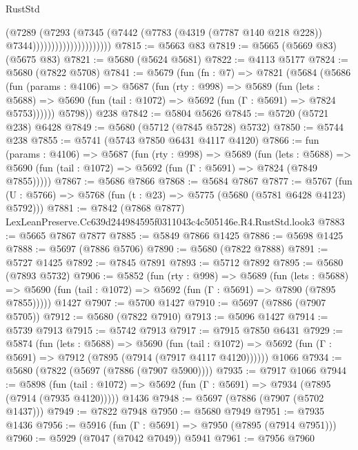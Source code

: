 \begin{lexlean}{RustStd}
\begin{coremodule}
                                    (@7289
                                      (@7293
                                        (@7345
                                          (@7442
                                            (@7783
                                              (@4319 (@7787 @140 @218 @228))
                                              @7344)))))))))))))))))))))
@7815 := @5663 @83
@7819 := @5665 (@5669 @83) (@5675 @83)
@7821 := @5680 (@5624 @5681)
@7822 := @4113 @5177
@7824 := @5680 (@7822 @5708)
@7841 := @5679
    (fun (fn : @7) =>
    @7821
      (@5684
        (@5686
          (fun (params : @4106) =>
          @5687
            (fun (rty : @998) =>
            @5689
              (fun (lets : @5688) =>
              @5690 (fun (tail : @1072) => @5692 (fun (Γ : @5691) => @7824 @5753))))))
        @5798))
    @238
@7842 := @5804 @5626
@7845 := @5720 (@5721 @238) @6428
@7849 := @5680 (@5712 (@7845 @5728) @5732)
@7850 := @5744 @238
@7855 := @5741 (@5743 @7850 @6431 @4117 @4120)
@7866 := fun (params : @4106) =>
  @5687
    (fun (rty : @998) =>
    @5689
      (fun (lets : @5688) =>
      @5690 (fun (tail : @1072) => @5692 (fun (Γ : @5691) => @7824 (@7849 @7855)))))
@7867 := @5686 @7866
@7868 := @5684 @7867
@7877 := @5767 (fun (U : @5766) => @5768 (fun (t : @23) => @5775 (@5680 (@5781 @6428 @4123) @5792)))
@7881 := @7842 (@7868 @7877) LexLeanPreserve.Cc639d244984595f0311043c4c505146e.R4.RustStd.look3
@7883 := @5665 @7867 @7877
@7885 := @5849 @7866 @1425
@7886 := @5698 @1425
@7888 := @5697 (@7886 @5706)
@7890 := @5680 (@7822 @7888)
@7891 := @5727 @1425
@7892 := @7845 @7891
@7893 := @5712 @7892
@7895 := @5680 (@7893 @5732)
@7906 := @5852
    (fun (rty : @998) =>
    @5689
      (fun (lets : @5688) =>
      @5690 (fun (tail : @1072) => @5692 (fun (Γ : @5691) => @7890 (@7895 @7855)))))
    @1427
@7907 := @5700 @1427
@7910 := @5697 (@7886 (@7907 @5705))
@7912 := @5680 (@7822 @7910)
@7913 := @5096 @1427
@7914 := @5739 @7913
@7915 := @5742 @7913
@7917 := @7915 @7850 @6431
@7929 := @5874
    (fun (lets : @5688) =>
    @5690
      (fun (tail : @1072) => @5692 (fun (Γ : @5691) => @7912 (@7895 (@7914 (@7917 @4117 @4120))))))
    @1066
@7934 := @5680 (@7822 (@5697 (@7886 (@7907 @5900))))
@7935 := @7917 @1066
@7944 := @5898
    (fun (tail : @1072) => @5692 (fun (Γ : @5691) => @7934 (@7895 (@7914 (@7935 @4120)))))
    @1436
@7948 := @5697 (@7886 (@7907 (@5702 @1437)))
@7949 := @7822 @7948
@7950 := @5680 @7949
@7951 := @7935 @1436
@7956 := @5916 (fun (Γ : @5691) => @7950 (@7895 (@7914 @7951)))
@7960 := @5929 (@7047 (@7042 @7049)) @5941
@7961 := @7956 @7960

\end{coremodule}
\end{lexlean}
